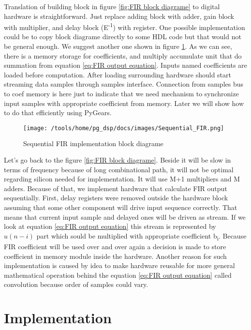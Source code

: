 \documentclass[a4paper, 12pt]{article}
\begin{document}
Translation of building block in figure \ref{fig:FIR block diagrame} to digital hardware is straightforward. Just replace adding block with adder, gain block with multiplier, and delay block (E\textsuperscript{-1}) with register. One possible implementation could be to copy block diagrame directly to some HDL code but that would not be general enough. We suggest another one shown in figure \ref{fig:Sequential FIR calculation}. As we can see, there is a memory storage for coefficients, and multiply accumulate unit that do summation from equation \ref{eq:FIR output equation}. Inputs named coefficients are loaded before computation. After loading surrounding hardware should start streaming data samples through samples interface. Connection from samples bus to coef memory is here just to indicate that we need mechanism to synchronize input samples with appropriate coefficient from memory. Later we will show how to do that efficiently using PyGears.

\begin{figure}[h]
\texttt{[image: /tools/home/pg\_dsp/docs/images/Sequential\_FIR.png]}
\caption{Sequential FIR implementation block diagrame}
\label{fig:Sequential FIR calculation}
\end{figure}


Let's go back to the figure \ref{fig:FIR block diagrame}. Beside it will be slow in terms of frequency because of long combinational path, it will not be optimal regarding silicon needed for implementation. It will use M+1 multipliers and M adders. Because of that, we implement hardware that calculate FIR output sequentially. First, delay registers were removed outside the hardware block assuming that some other component will drive input sequence correctly. That means that current input sample and delayed ones will be driven as stream. If we look at equation \eqref{eq:FIR output equation} this stream is represented by $u(n-i)$ part which sould be multiplied with appropriate coefficient b\textsubscript{i}. Because FIR coefficient will be used over and over again a decision is made to store coefficient in memory module inside the hardware. Another reason for such implementation is caused by idea to make hardware reusable for more general mathematical operation behind the equation \eqref{eq:FIR output equation} called convolution because order of samples could vary.

\section{Implementation}
\end{document}
